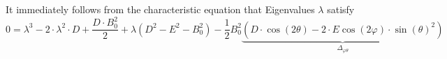 It immediately follows from the characteristic equation that Eigenvalues $\lambda$ satisfy 
\begin{equation}
    0 = \lambda^3 - 2\cdot \lambda^2 \cdot D + \frac{D \cdot B_0^2}{2} + \lambda(D^2 - E^2 - B_0^2) - \frac{1}{2}B_0^2\underbrace{\left(D \cdot \cos(2\theta) - 2 \cdot E \cos(2\varphi) \cdot \sin(\theta)^2\right)}_{\Delta_{\varphi \theta}}
    \label{eq:nv_spherical_characteristic_equation}
\end{equation}





